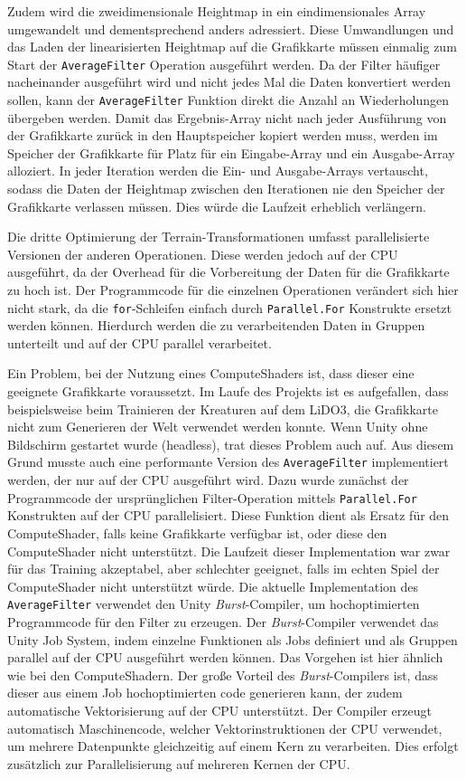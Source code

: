 Zudem wird die zweidimensionale Heightmap in ein eindimensionales Array umgewandelt und dementsprechend anders adressiert.
Diese Umwandlungen und das Laden der linearisierten Heightmap auf die Grafikkarte müssen einmalig zum Start der \texttt{AverageFilter} Operation ausgeführt werden.
Da der Filter häufiger nacheinander ausgeführt wird und nicht jedes Mal die Daten konvertiert werden sollen, kann der \texttt{AverageFilter} Funktion direkt die Anzahl an Wiederholungen übergeben werden.
Damit das Ergebnis-Array nicht nach jeder Ausführung von der Grafikkarte zurück in den Hauptspeicher kopiert werden muss, werden im Speicher der Grafikkarte für Platz für ein Eingabe-Array und ein Ausgabe-Array alloziert.
In jeder Iteration werden die Ein- und Ausgabe-Arrays vertauscht, sodass die Daten der Heightmap zwischen den Iterationen nie den Speicher der Grafikkarte verlassen müssen.
Dies würde die Laufzeit erheblich verlängern.

Die dritte Optimierung der Terrain-Transformationen umfasst parallelisierte Versionen der anderen Operationen.
Diese werden jedoch auf der CPU ausgeführt, da der Overhead für die Vorbereitung der Daten für die Grafikkarte zu hoch ist.
Der Programmcode für die einzelnen Operationen verändert sich hier nicht stark, da die \texttt{for}-Schleifen einfach durch \texttt{Parallel.For} Konstrukte ersetzt werden können.
Hierdurch werden die zu verarbeitenden Daten in Gruppen unterteilt und auf der CPU parallel verarbeitet.

Ein Problem, bei der Nutzung eines ComputeShaders ist, dass dieser eine geeignete Grafikkarte voraussetzt.
Im Laufe des Projekts ist es aufgefallen, dass beispielsweise beim Trainieren der Kreaturen auf dem LiDO3, die Grafikkarte nicht zum Generieren der Welt verwendet werden konnte.
Wenn Unity ohne Bildschirm gestartet wurde (headless), trat dieses Problem auch auf.
Aus diesem Grund musste auch eine performante Version des \texttt{AverageFilter} implementiert werden, der nur auf der CPU ausgeführt wird.
Dazu wurde zunächst der Programmcode der ursprünglichen Filter-Operation mittels \texttt{Parallel.For} Konstrukten auf der CPU parallelisiert.
Diese Funktion dient als Ersatz für den ComputeShader, falls keine Grafikkarte verfügbar ist, oder diese den ComputeShader nicht unterstützt.
Die Laufzeit dieser Implementation war zwar für das Training akzeptabel, aber schlechter geeignet, falls im echten Spiel der ComputeShader nicht unterstützt würde.
Die aktuelle Implementation des \texttt{AverageFilter} verwendet den Unity \textit{Burst}-Compiler, um hochoptimierten Programmcode für den Filter zu erzeugen.
Der \textit{Burst}-Compiler verwendet das Unity Job System, indem einzelne Funktionen als Jobs definiert und als Gruppen parallel auf der CPU ausgeführt werden können.
Das Vorgehen ist hier ähnlich wie bei den ComputeShadern.
Der große Vorteil des \textit{Burst}-Compilers ist, dass dieser aus einem Job hochoptimierten code generieren kann, der zudem automatische Vektorisierung auf der CPU unterstützt.
Der Compiler erzeugt automatisch Maschinencode, welcher Vektorinstruktionen der CPU verwendet, um mehrere Datenpunkte gleichzeitig auf einem Kern zu verarbeiten.
Dies erfolgt zusätzlich zur Parallelisierung auf mehreren Kernen der CPU.

